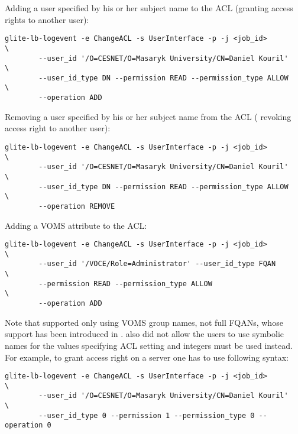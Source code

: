 Adding a user specified by his or her subject name to the ACL (\ie granting
access rights to another user):

\begin{verbatim}
glite-lb-logevent -e ChangeACL -s UserInterface -p -j <job_id>          \
        --user_id '/O=CESNET/O=Masaryk University/CN=Daniel Kouril'     \
        --user_id_type DN --permission READ --permission_type ALLOW     \
        --operation ADD
\end{verbatim}


Removing a user specified by his or her subject name from the ACL (\ie
revoking access right to another user):

\begin{verbatim}
glite-lb-logevent -e ChangeACL -s UserInterface -p -j <job_id>          \
        --user_id '/O=CESNET/O=Masaryk University/CN=Daniel Kouril'     \
        --user_id_type DN --permission READ --permission_type ALLOW     \
        --operation REMOVE
\end{verbatim}


Adding a VOMS attribute to the ACL:

\begin{verbatim}
glite-lb-logevent -e ChangeACL -s UserInterface -p -j <job_id>          \
        --user_id '/VOCE/Role=Administrator' --user_id_type FQAN        \
        --permission READ --permission_type ALLOW                       \
        --operation ADD
\end{verbatim}


Note that  supported only using VOMS group names, not full FQANs,
whose support has been introduced in .  also did not
allow the users to use symbolic names for the values specifying ACL
setting and integers must be used instead. For example, to grant access
right on a \LBver{1.x} server one has to use following syntax:

\begin{verbatim}
glite-lb-logevent -e ChangeACL -s UserInterface -p -j <job_id>          \
        --user_id '/O=CESNET/O=Masaryk University/CN=Daniel Kouril'     \
        --user_id_type 0 --permission 1 --permission_type 0 --operation 0
\end{verbatim}
